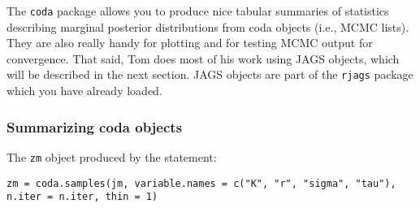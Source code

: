 \documentclass[12pt,english]{article}
\begin{document}
The \texttt{coda} package \citep{Plummer2016coda} allows you to produce nice tabular summaries of statistics describing marginal posterior distributions from coda objects (i.e., MCMC lists). They are also really handy for plotting and for testing MCMC output for convergence. That said, Tom does most of his work using JAGS objects, which will be described in the next section. JAGS objects are part of the \texttt{rjags} package which you have already loaded.

\subsubsection{Summarizing coda objects}

The \texttt{zm} object produced by the statement:

\begin{Verbatim}
zm = coda.samples(jm, variable.names = c("K", "r", "sigma", "tau"), 
n.iter = n.iter, thin = 1)
\end{Verbatim}
\end{document}
